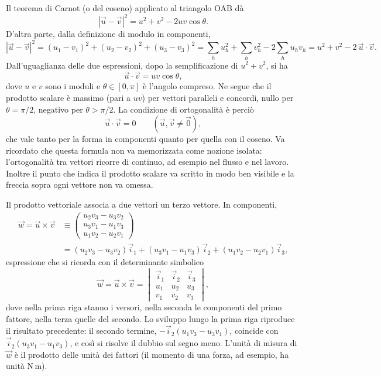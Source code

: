 \documentclass[11pt,a4paper]{article}
\begin{document}
Il teorema di Carnot (o del coseno) applicato al triangolo OAB dà
\[
|\vec u-\vec v|^2=u^2+v^2-2uv\cos\theta .
\]
D'altra parte, dalla definizione di modulo in componenti,
\[
|\vec u-\vec v|^2=(u_1-v_1)^2+(u_2-v_2)^2+(u_3-v_3)^2=\sum_h u_h^2+\sum_h v_h^2-2\sum_h u_hv_h=u^2+v^2-2\,\vec u\cdot\vec v .
\]
Dall'uguaglianza delle due espressioni, dopo la semplificazione di $u^2+v^2$, si ha
\[
\vec u\cdot\vec v=uv\cos\theta ,
\]
dove $u$ e $v$ sono i moduli e $\theta\in[0,\pi]$ è l'angolo compreso. Ne segue che il prodotto scalare è massimo (pari a $uv$) per vettori paralleli e concordi, nullo per $\theta=\pi/2$, negativo per $\theta>\pi/2$. La condizione di ortogonalità è perciò
\[
\vec u\cdot\vec v=0 \qquad(\vec u,\vec v\neq\vec 0),
\]
che vale tanto per la forma in componenti quanto per quella con il coseno. Va ricordato che questa formula non va memorizzata come nozione isolata: l'ortogonalità tra vettori ricorre di continuo, ad esempio nel flusso e nel lavoro. Inoltre il punto che indica il prodotto scalare va scritto in modo ben visibile e la freccia sopra ogni vettore non va omessa.

Il prodotto vettoriale associa a due vettori un terzo vettore. In componenti,
\begin{align*}
\vec w=\vec u\times\vec v&\equiv\begin{pmatrix}u_2v_3-u_3v_2\\u_3v_1-u_1v_3\\u_1v_2-u_2v_1\end{pmatrix}\\
&=(u_2v_3-u_3v_2)\vec i_1+(u_3v_1-u_1v_3)\vec i_2+(u_1v_2-u_2v_1)\vec i_3 ,
\end{align*}
espressione che si ricorda con il determinante simbolico
\[
\vec w=\vec u\times\vec v=\begin{vmatrix}\vec i_1&\vec i_2&\vec i_3\\u_1&u_2&u_3\\v_1&v_2&v_3\end{vmatrix},
\]
dove nella prima riga stanno i versori, nella seconda le componenti del primo fattore, nella terza quelle del secondo. Lo sviluppo lungo la prima riga riproduce il risultato precedente: il secondo termine, $-\vec i_2(u_1v_3-u_3v_1)$, coincide con $\vec i_2(u_3v_1-u_1v_3)$, e così si risolve il dubbio sul segno meno. L'unità di misura di $\vec w$ è il prodotto delle unità dei fattori (il momento di una forza, ad esempio, ha unità $\mathrm{N\,m}$).
\end{document}
